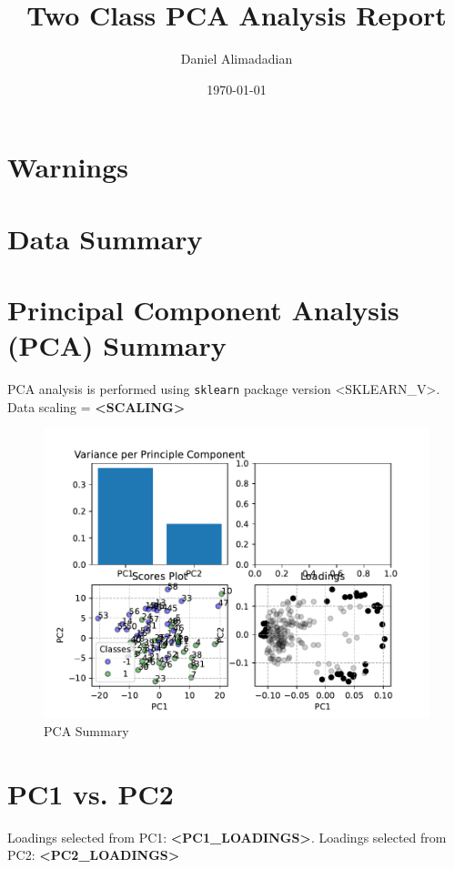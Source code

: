 \documentclass[]{article}
\title{Two Class PCA Analysis Report}
\author{Daniel Alimadadian}
\date{\today}
\begin{document}
\begin{titlepage}
    \maketitle
    \section*{Warnings}
    \section*{Data Summary}
\end{titlepage}

\section*{Principal Component Analysis (PCA) Summary}
    PCA analysis is performed using \texttt{sklearn} package version <SKLEARN_V>. \\
    Data scaling = \textbf{<SCALING>}

    \begin{figure}[h!]
        \begin{center}
            \includegraphics{<SUMMARY_FIGS>}    
        \end{center}
        \caption{PCA Summary}
    \end{figure}
    
\newpage

\section*{PC1 vs. PC2}
    Loadings selected from PC1: \textbf{<PC1_LOADINGS>}. Loadings selected from PC2: \textbf{<PC2_LOADINGS>} 
\end{document}
